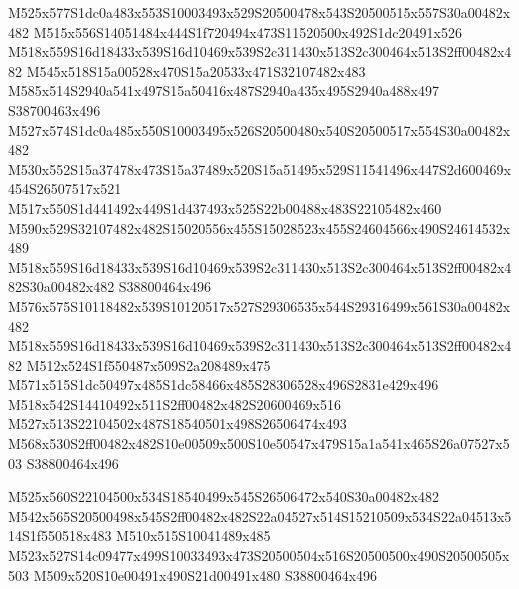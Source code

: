 \documentclass{article}
\begin{document}
\begin{multicols}{2}
M525x577S1dc0a483x553S10003493x529S20500478x543S20500515x557S30a00482x482 M515x556S14051484x444S1f720494x473S11520500x492S1dc20491x526 M518x559S16d18433x539S16d10469x539S2c311430x513S2c300464x513S2ff00482x482 M545x518S15a00528x470S15a20533x471S32107482x483 M585x514S2940a541x497S15a50416x487S2940a435x495S2940a488x497 S38700463x496 M527x574S1dc0a485x550S10003495x526S20500480x540S20500517x554S30a00482x482 M530x552S15a37478x473S15a37489x520S15a51495x529S11541496x447S2d600469x454S26507517x521 M517x550S1d441492x449S1d437493x525S22b00488x483S22105482x460 M590x529S32107482x482S15020556x455S15028523x455S24604566x490S24614532x489 M518x559S16d18433x539S16d10469x539S2c311430x513S2c300464x513S2ff00482x482S30a00482x482 S38800464x496 M576x575S10118482x539S10120517x527S29306535x544S29316499x561S30a00482x482 M518x559S16d18433x539S16d10469x539S2c311430x513S2c300464x513S2ff00482x482 M512x524S1f550487x509S2a208489x475 M571x515S1dc50497x485S1dc58466x485S28306528x496S2831e429x496 M518x542S14410492x511S2ff00482x482S20600469x516 M527x513S22104502x487S18540501x498S26506474x493 M568x530S2ff00482x482S10e00509x500S10e50547x479S15a1a541x465S26a07527x503 S38800464x496

M525x560S22104500x534S18540499x545S26506472x540S30a00482x482 M542x565S20500498x545S2ff00482x482S22a04527x514S15210509x534S22a04513x514S1f550518x483 M510x515S10041489x485 M523x527S14c09477x499S10033493x473S20500504x516S20500500x490S20500505x503 M509x520S10e00491x490S21d00491x480 S38800464x496







\end{multicols}
\end{document}
